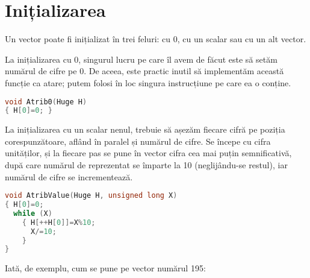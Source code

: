 \section{Inițializarea}

Un vector poate fi inițializat în trei feluri: cu 0, cu un scalar sau cu un
alt vector.

La inițializarea cu 0, singurul lucru pe care îl avem de făcut este să setăm
numărul de cifre pe 0. De aceea, este practic inutil să implementăm această
funcție ca atare; putem folosi în loc singura instrucțiune pe care ea o
conține.

\begin{lstlisting}[language=C]
void Atrib0(Huge H)
{ H[0]=0; }
\end{lstlisting}

La inițializarea cu un scalar nenul, trebuie să așezăm fiecare cifră pe
poziția corespunzătoare, aflând în paralel și numărul de cifre. Se începe cu
cifra unităților, și la fiecare pas se pune în vector cifra cea mai puțin
semnificativă, după care numărul de reprezentat se împarte la 10
(neglijându-se restul), iar numărul de cifre se incrementează.

\begin{lstlisting}[language=C]
void AtribValue(Huge H, unsigned long X)
{ H[0]=0;
  while (X)
    { H[++H[0]]=X%10;
      X/=10;
    }
}
\end{lstlisting}

Iată, de exemplu, cum se pune pe vector numărul 195:

